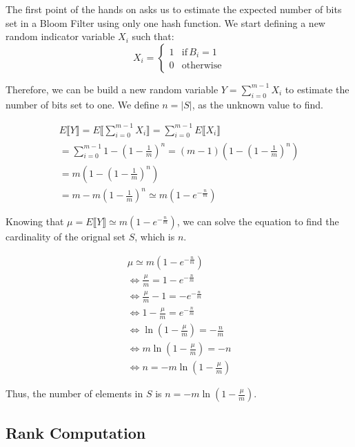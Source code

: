 \documentclass{article}
\begin{document}
The first point of the hands on asks us to estimate the expected number of bits set in a Bloom Filter using only one hash function.
We start defining a new random indicator variable $X_i$ such that:
\begin{equation}
    X_i = \begin{cases}
        1 & \textrm{if} \, B_i = 1 \\
        0 & \textrm{otherwise}
    \end{cases}
\end{equation}

Therefore, we can be build a new random variable $Y = \sum_{i = 0}^{m - 1}X_i$ to estimate the number of bits set to one. We define $n = |S|$, as the unknown value to find. 

\begin{align*}
    E \llbracket Y \rrbracket = E \bigg\llbracket  \sum_{i = 0}^{m - 1}X_i \bigg\rrbracket = \sum_{i = 0}^{m - 1} E \llbracket X_i \rrbracket \\
    = \sum_{i = 0}^{m - 1} 1 - (1 - \frac{1}{m})^n = (m - 1)(1 - (1 - \frac{1}{m})^n) \\
    = m(1 - (1 - \frac{1}{m})^n) \\
    = m - m(1 - \frac{1}{m})^n \simeq m (1 - e^{-\frac{n}{m}})
\end{align*}

\noindent Knowing that $\mu = E \llbracket Y \rrbracket \simeq m (1 - e^{-\frac{n}{m}})$, we can solve the equation to find the cardinality of the orignal set $S$, which is $n$.

\begin{align*}
    \mu \simeq m (1 - e^{-\frac{n}{m}}) \\
    \iff \frac{\mu}{m} = 1 - e^{-\frac{n}{m}} \\
    \iff \frac{\mu}{m} - 1 = - e^{-\frac{n}{m}} \\
    \iff 1 - \frac{\mu}{m} = e^{-\frac{n}{m}} \\
    \iff \ln (1 - \frac{\mu}{m}) = -\frac{n}{m} \\
    \iff m \ln (1 - \frac{\mu}{m}) = - n \\
    \iff n = -m \ln (1 - \frac{\mu}{m})
\end{align*}

\noindent Thus, the number of elements in $S$ is $n =  -m \ln (1 - \frac{\mu}{m})$.

\subsection{Rank Computation}
\end{document}
